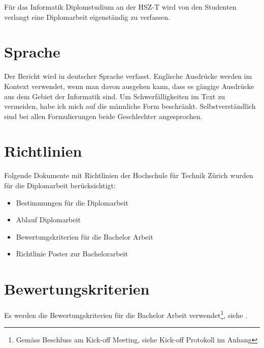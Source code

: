   Für das Informatik Diplomstudium an der \ac{HSZ-T} wird von den Studenten
  verlangt eine Diplomarbeit eigenständig zu verfassen.
  
  \section{Sprache}
  
  Der Bericht wird in deutscher Sprache verfasst. Englische Ausdrücke werden im
  Kontext verwendet, wenn man davon ausgehen kann, dass es gängige Ausdrücke aus
  dem Gebiet der Informatik sind. Um Schwerfälligkeiten im Text zu vermeiden,
  habe ich mich auf die männliche Form beschränkt. Selbstverständlich sind bei
  allen Formulierungen beide Geschlechter angesprochen.
    
  \section{Richtlinien}
  Folgende Dokumente mit Richtlinien der Hochschule für Technik Zürich wurden
  für die Diplomarbeit berücksichtigt:

  \begin{itemize}
      \item Bestimmungen für die Diplomarbeit \cite{hsz_reglement}
      \item Ablauf Diplomarbeit \cite{hsz_ablauf}
      \item Bewertungskriterien für die Bachelor Arbeit
      \cite{hsz_bewertungskriterien}
      \item Richtlinie Poster zur Bachelorarbeit \cite{hsz_poster}
  \end{itemize} 
    
  \section{Bewertungskriterien}
  
  Es werden die Bewertungskriterien für die Bachelor Arbeit
  verwendet\footnote{Gemäss Beschluss am Kick-off Meeting, siehe Kick-off
  Protokoll im Anhang}, siehe \cite{hsz_bewertungskriterien}.
